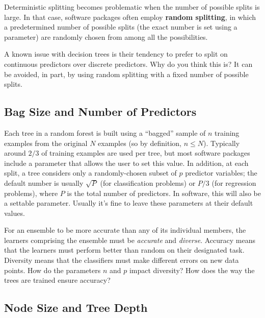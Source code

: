\vspace{3mm}

Deterministic splitting becomes problematic when the number of possible splits is large. In that case, software packages often employ \textbf{random splitting}, in which a predetermined number of possible splits (the exact number is set using a parameter) are randomly chosen from among all the possibilities. 

\vspace{5mm}

\begin{question}{}
A known issue with decision trees is their tendency to prefer to split on continuous predictors over discrete predictors. Why do you think this is? It can be avoided, in part, by using random splitting with a fixed number of possible splits. 
\end{question}

\subsection{Bag Size and Number of Predictors}

Each tree in a random forest is built using a ``bagged'' sample of $n$ training examples from the original $N$ examples (so by definition, $n \leq N$). Typically around $2/3$ of training examples are used per tree, but most software packages include a parameter that allows the user to set this value. In addition, at each split, a tree considers only a randomly-chosen subset of $p$ predictor variables; the default number is usually $\sqrt{P}$ (for classification problems) or $P/3$ (for regression problems), where $P$ is the total number of predictors. In software, this will also be a settable parameter. Usually it's fine to leave these parameters at their default values.

\vspace{5mm}

\begin{question}{}
For an ensemble to be more accurate than any of its individual members, the learners comprising the ensemble must be \emph{accurate} and \emph{diverse}. Accuracy means that the learners must perform better than random on their designated task. Diversity means that the classifiers must make different errors on new data points. How do the parameters $n$ and $p$ impact diversity? How does the way the trees are trained ensure accuracy?
\end{question} 

\subsection{Node Size and Tree Depth}

